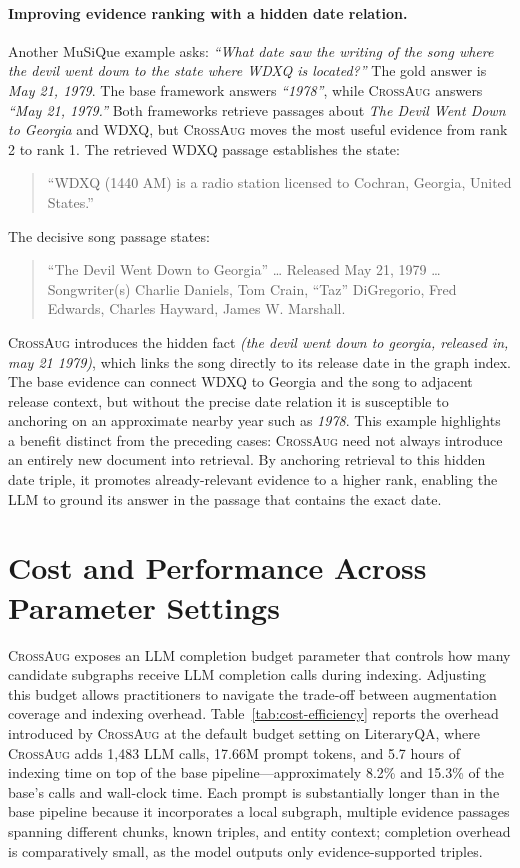 \documentclass[11pt]{article}
\newcommand{\ours}{\textsc{CrossAug}\xspace}
\begin{document}
\paragraph{Improving evidence ranking with a hidden date relation.}
Another MuSiQue example asks: \textit{``What date saw the writing of the song where the devil went down to the state where WDXQ is located?''} The gold answer is \textit{May 21, 1979}. The base framework answers \textit{``1978''}, while \ours answers \textit{``May 21, 1979.''} Both frameworks retrieve passages about \textit{The Devil Went Down to Georgia} and WDXQ, but \ours moves the most useful evidence from rank 2 to rank 1. The retrieved WDXQ passage establishes the state:

\begin{quote}
\small
``WDXQ (1440 AM) is a radio station licensed to Cochran, Georgia, United States.''
\end{quote}

The decisive song passage states:

\begin{quote}
\small
``The Devil Went Down to Georgia'' \ldots{} Released May 21, 1979 \ldots{} Songwriter(s) Charlie Daniels, Tom Crain, ``Taz'' DiGregorio, Fred Edwards, Charles Hayward, James W. Marshall.
\end{quote}

\ours introduces the hidden fact \textit{(the devil went down to georgia, released in, may 21 1979)}, which links the song directly to its release date in the graph index. The base evidence can connect WDXQ to Georgia and the song to adjacent release context, but without the precise date relation it is susceptible to anchoring on an approximate nearby year such as \textit{1978}. This example highlights a benefit distinct from the preceding cases: \ours need not always introduce an entirely new document into retrieval. By anchoring retrieval to this hidden date triple, it promotes already-relevant evidence to a higher rank, enabling the LLM to ground its answer in the passage that contains the exact date.


\section{Cost and Performance Across Parameter Settings}
\label{sec:cost-sensitivity}

\ours exposes an LLM completion budget parameter that controls how many candidate subgraphs receive LLM completion calls during indexing. Adjusting this budget allows practitioners to navigate the trade-off between augmentation coverage and indexing overhead. Table~\ref{tab:cost-efficiency} reports the overhead introduced by \ours at the default budget setting on LiteraryQA, where \ours adds 1,483 LLM calls, 17.66M prompt tokens, and 5.7 hours of indexing time on top of the base pipeline---approximately 8.2\% and 15.3\% of the base's calls and wall-clock time. Each prompt is substantially longer than in the base pipeline because it incorporates a local subgraph, multiple evidence passages spanning different chunks, known triples, and entity context; completion overhead is comparatively small, as the model outputs only evidence-supported triples.
\end{document}

